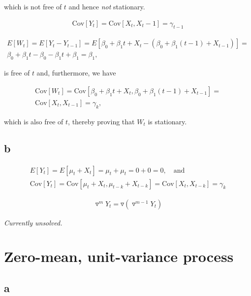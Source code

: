 \documentclass[]{book}
\begin{document}
which is not free of \(t\) and hence \emph{not} stationary.

\begin{gather*}
  \text{Cov}[Y_t] = \text{Cov}[X_t, X_t-1] = \gamma_{t-1}
\end{gather*}

\begin{gather*}
  E[W_t] = E[Y_t - Y_{t-1}] = E[\beta_0 + \beta_1 t + X_t - (\beta_0 + \beta_1(t-1) + X_{t-1})] =\\
  \beta_0 + \beta_1 t - \beta_0 - \beta_1 t + \beta_1  = \beta_1,
\end{gather*}

is free of \(t\) and, furthermore, we have

\begin{gather*}
  \text{Cov}[W_t] = \text{Cov}[\beta_0 + \beta_1 t + X_t, \beta_0 + \beta_1 (t-1) + X_{t-1}] =\\
  \text{Cov}[X_t, X_{t-1}] = \gamma_k,  
\end{gather*}

which is also free of \(t\), thereby proving that \(W_t\) is stationary.

\subsection*{b}\label{b-6}

\begin{gather*}
  E[Y_t] = E[\mu_t + X_t] = \mu_t + \mu_t = 0 + 0 = 0, \quad \text{and}\\
  \text{Cov}[Y_t] = \text{Cov}[\mu_t + X_t, \mu_{t-k} + X_{t-k}] = \text{Cov}[X_t, X_{t-k}] = \gamma_k
\end{gather*}

\begin{gather*}
  \triangledown^m Y_t = \triangledown(\triangledown^{m−1}Y_t)
\end{gather*}

\emph{Currently unsolved.}

\section{Zero-mean, unit-variance
process}\label{zero-mean-unit-variance-process}

\subsection*{a}\label{a-7}
\end{document}
